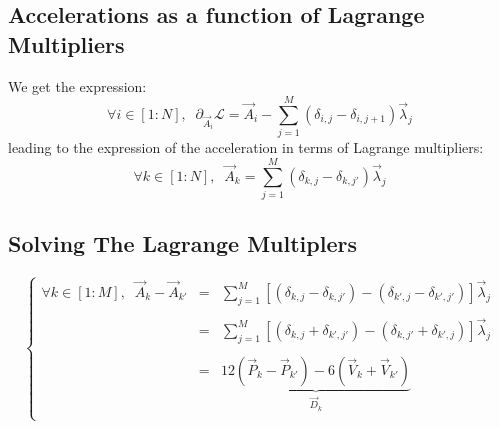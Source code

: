 \documentclass[aps,12pt]{revtex4}
\begin{document}
\subsection{Accelerations as a function of Lagrange Multipliers}
We get the expression:
\begin{equation}
	\forall i \in [1:N],\;\; \partial_{\vec{A}_i} \mathcal{L} = \vec{A}_i 
	- \sum_{j=1}^M \left( \delta_{i,j} - \delta_{i,j+1}\right)\vec{\lambda}_j
\end{equation}
leading to the expression of the acceleration in terms of Lagrange multipliers:
\begin{equation}
\boxed{
	\forall k \in [1:N],\;\;\vec{A}_k = \sum_{j=1}^M \left( \delta_{k,j} - \delta_{k,j'}\right)\vec{\lambda}_j
}
\end{equation}

\subsection{Solving The Lagrange Multiplers}
\begin{equation}
\left\lbrace
\begin{array}{rcl}
	\forall k \in [1:M],\;\; \vec{A}_k - \vec{A}_{k'} & = & \displaystyle \sum_{j=1}^M \left[\left( \delta_{k,j} - \delta_{k,j'}\right) - \left( \delta_{k',j} - \delta_{k',j'}\right)\right]\vec{\lambda}_j \\
	\\
	& = & \displaystyle \sum_{j=1}^M \left[\left( \delta_{k,j} +\delta_{k',j'} \right) - \left(\delta_{k,j'}+\delta_{k',j}\right) \right]\vec{\lambda}_j \\
	\\
	 & = & \underbrace{12\left(\vec{P}_k-\vec{P}_{k'}\right) - 6 \left(\vec{V}_k+\vec{V}_{k'}\right)}_{\vec{D}_k}\\
\end{array}	
\right. 
\end{equation}
\end{document}
